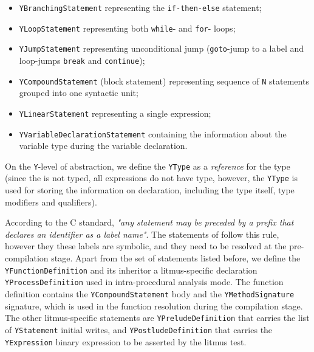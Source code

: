 \begin{itemize}%
  \item \texttt{YBranchingStatement} representing the \texttt{if-then-else} statement;
  
  \item \texttt{YLoopStatement} representing both \texttt{while}- and \texttt{for}- loops;%
  
  \item \texttt{YJumpStatement} representing unconditional jump (\texttt{goto}-jump to a label and loop-jumps \texttt{break} and \texttt{continue});
  
  \item \texttt{YCompoundStatement} (block statement) representing sequence of \texttt{N} statements grouped into one syntactic unit;
  
  \item \texttt{YLinearStatement} representing a single expression;
  
  \item \texttt{YVariableDeclarationStatement} containing the information about the variable type during the variable declaration.
\end{itemize}

On the \texttt{Y}-level of abstraction, we define the \texttt{YType} as a \textit{reference} for the type (since the \ytree{} is not typed, all expressions do not have type, however, the \texttt{YType} is used for storing the information on declaration, including the type itself, type modifiers and qualifiers).

According to the C standard, \textit{"any statement may be preceded by a prefix that declares an identifier as a label name"}.
The \ytree{} statements of follow this rule, however they these labels are symbolic, and they need to be resolved at the pre-compilation stage.
Apart from the set of statements listed before, we define the \texttt{YFunctionDefinition} and its inheritor a litmus-specific declaration \texttt{YProcessDefinition}
used in intra-procedural analysis mode.
The function definition contains the \texttt{YCompoundStatement} body and the \texttt{YMethodSignature} signature, which is used in the function resolution during the compilation stage. %
The other litmus-specific statements are \texttt{YPreludeDefinition}
that carries the list of \texttt{YStatement} initial writes, and \texttt{YPostludeDefinition} 
that carries the \texttt{YExpression} binary expression to be asserted by the litmus test.

